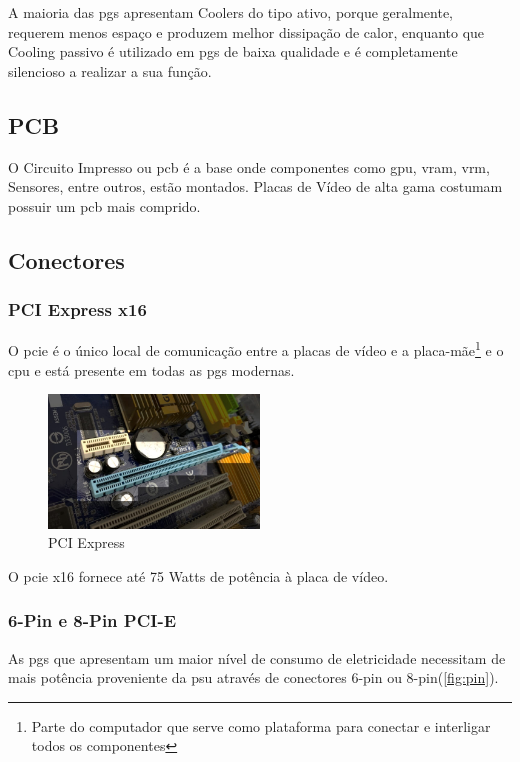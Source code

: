 \documentclass{report}
\begin{document}
A maioria das \acp{pg} apresentam Coolers do tipo ativo, porque geralmente, requerem menos espaço e produzem melhor dissipação de calor, enquanto que Cooling passivo é utilizado em \acp{pg} de baixa qualidade e é completamente silencioso a realizar a sua função.
\clearpage

\subsection{PCB}
\label{sec.pcb}

O Circuito Impresso ou \ac{pcb} é a base onde componentes como \ac{gpu}, \ac{vram}, \ac{vrm}, Sensores, entre outros, estão montados. Placas de Vídeo de alta gama costumam possuir um \ac{pcb} mais comprido.

\subsection{Conectores}
\label{sec.conec}
\subsubsection{PCI Express x16}
O \ac{pcie} é o único local de comunicação entre a placas de vídeo e a placa-mãe\footnote{Parte do computador que serve como plataforma para conectar e interligar todos os componentes} e o \ac{cpu} e está presente em todas as \acp{pg} modernas.

\begin{figure}[h]
\centering
\includegraphics[width=0.5\textwidth]{pcie16.jpg}
\caption{PCI Express}
\label{fig:pcie}
\end{figure}

O \ac{pcie} x16 fornece até 75 Watts de potência à placa de vídeo.
\clearpage
\subsubsection{6-Pin e 8-Pin PCI-E}

As \acp{pg} que apresentam um maior nível de consumo de eletricidade necessitam de mais potência proveniente da \ac{psu} através de conectores 6-pin ou 8-pin(\autoref{fig:pin}).
\end{document}
